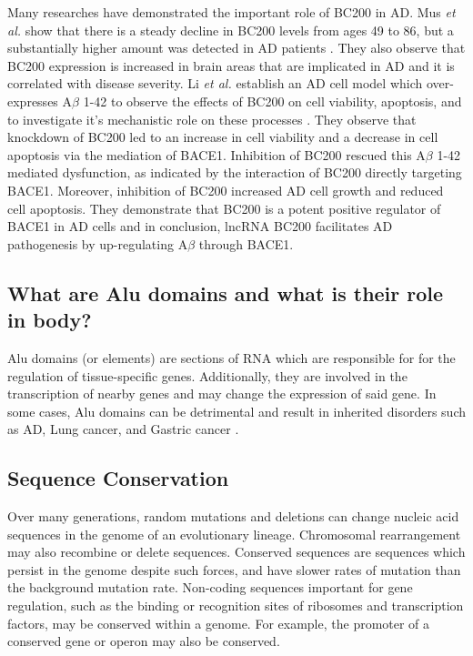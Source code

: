 \documentclass[conference, 11pt]{IEEEtran}
\begin{document}
Many researches have demonstrated the important role of BC200 in AD. 
Mus \emph{et al.} show that there is a steady decline in BC200 levels from ages 49 to 86, but a substantially higher amount was detected in AD patients \cite{mus2007dendritic}. 
They also observe that BC200 expression is increased in brain areas that are implicated in AD and it is correlated with disease severity. 
Li \emph{et al.} establish an AD cell model which over-expresses A$\beta$ 1-42 to observe the effects of BC200 on cell viability, apoptosis, and to investigate it's mechanistic role on these processes \cite{li2018identification}. 
They observe that knockdown of BC200 led to an increase in cell viability and a decrease in cell apoptosis via the mediation of BACE1.
Inhibition of BC200 rescued this A$\beta$ 1-42 mediated dysfunction, as indicated by the interaction of BC200 directly targeting BACE1. 
Moreover, inhibition of BC200 increased AD cell growth and reduced cell apoptosis. 
They demonstrate that BC200 is a potent positive regulator of BACE1 in AD cells and in conclusion, lncRNA BC200 facilitates AD pathogenesis by up-regulating A$\beta$ through BACE1.

\subsection{What are Alu domains and what is their role in body?}

Alu domains (or elements) are sections of RNA which are responsible for for the regulation of tissue-specific genes. 
Additionally, they are involved in the transcription of nearby genes and may change the expression of said gene. 
In some cases,  Alu domains can be detrimental and result in inherited disorders such as AD, Lung cancer, and Gastric cancer \cite{tseng2013oxidative}. 

\subsection{Sequence Conservation}

Over many generations, random mutations and deletions can change nucleic acid sequences in the genome of an evolutionary lineage. 
Chromosomal rearrangement may also recombine or delete sequences. 
Conserved sequences are sequences which persist in the genome despite such forces, and have slower rates of mutation than the background mutation rate\cite{kimura1974some}. 
Non-coding sequences important for gene regulation, such as the binding or recognition sites of ribosomes and transcription factors, may be conserved within a genome. For example, the promoter of a conserved gene or operon may also be conserved.
\end{document}
